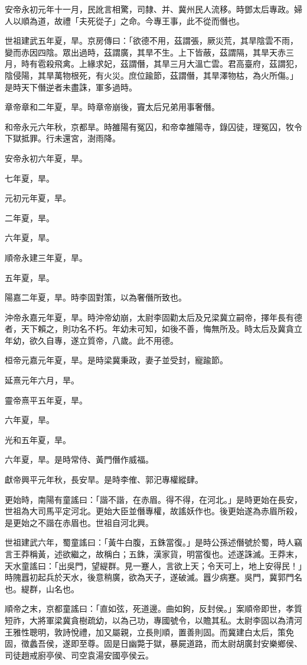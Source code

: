 \begin{pinyinscope}
安帝永初元年十一月，民訛言相驚，司隸、并、冀州民人流移。時鄧太后專政。婦人以順為道，故禮「夫死從子」之命。今專王事，此不從而僭也。

世祖建武五年夏，旱。京房傳曰：「欲德不用，茲謂張，厥災荒，其旱陰雲不雨，變而赤因四陰。眾出過時，茲謂廣，其旱不生。上下皆蔽，茲謂隔，其旱天赤三月，時有雹殺飛禽。上緣求妃，茲謂僭，其旱三月大溫亡雲。君高臺府，茲謂犯，陰侵陽，其旱萬物根死，有火災。庶位踰節，茲謂僭，其旱澤物枯，為火所傷。」是時天下僭逆者未盡誅，軍多過時。

章帝章和二年夏，旱。時章帝崩後，竇太后兄弟用事奢僭。

和帝永元六年秋，京都旱。時雒陽有冤囚，和帝幸雒陽寺，錄囚徒，理冤囚，牧令下獄抵罪。行未還宮，澍雨降。

安帝永初六年夏，旱。

七年夏，旱。

元初元年夏，旱。

二年夏，旱。

六年夏，旱。

順帝永建三年夏，旱。

五年夏，旱。

陽嘉二年夏，旱。時李固對策，以為奢僭所致也。

沖帝永嘉元年夏，旱。時沖帝幼崩，太尉李固勸太后及兄梁冀立嗣帝，擇年長有德者，天下賴之，則功名不朽。年幼未可知，如後不善，悔無所及。時太后及冀貪立年幼，欲久自專，遂立質帝，八歲。此不用德。

桓帝元嘉元年夏，旱。是時梁冀秉政，妻子並受封，寵踰節。

延熹元年六月，旱。

靈帝熹平五年夏，旱。

六年夏，旱。

光和五年夏，旱。

六年夏，旱。是時常侍、黃門僭作威福。

獻帝興平元年秋，長安旱。是時李傕、郭汜專權縱肆。

更始時，南陽有童謠曰：「諧不諧，在赤眉。得不得，在河北。」是時更始在長安，世祖為大司馬平定河北。更始大臣並僭專權，故謠妖作也。後更始遂為赤眉所殺，是更始之不諧在赤眉也。世祖自河北興。

世祖建武六年，蜀童謠曰：「黃牛白腹，五銖當復。」是時公孫述僭號於蜀，時人竊言王莽稱黃，述欲繼之，故稱白；五銖，漢家貨，明當復也。述遂誅滅。王莽末，天水童謠曰：「出吳門，望緹群。見一蹇人，言欲上天；令天可上，地上安得民！」時隗囂初起兵於天水，後意稍廣，欲為天子，遂破滅。囂少病蹇。吳門，冀郭門名也。緹群，山名也。

順帝之末，京都童謠曰：「直如弦，死道邊。曲如鉤，反封侯。」案順帝即世，孝質短祚，大將軍梁冀貪樹疏幼，以為己功，專國號令，以贍其私。太尉李固以為清河王雅性聰明，敦詩悅禮，加又屬親，立長則順，置善則固。而冀建白太后，策免固，徵蠡吾侯，遂即至尊。固是日幽斃于獄，暴屍道路，而太尉胡廣封安樂鄉侯、司徒趙戒廚亭侯、司空袁湯安國亭侯云。


\end{pinyinscope}
